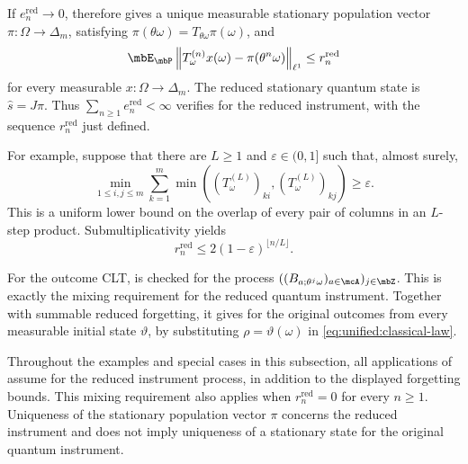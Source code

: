 \documentclass[a4paper]{article}
\numberwithin{equation}{section}   %
\theoremstyle{plain}   %
\theoremstyle{plain}   %
\theoremstyle{examplestyle}
\DeclareMathOperator{\pr}{\mbP}           %
\begin{document}
        If $e_n^{\mathrm{red}}\to0$,  therefore gives a unique measurable stationary population vector $\pi:\Omega\to\Delta_m$, satisfying $\pi(\theta\omega)=T_{\theta\omega}\pi(\omega)$, and
        \begin{equation}
        \label{eq:examples:population-forgetting}
             \mbE_{\pr}
             \left\|T_\omega^{(n)}x(\omega)-\pi(\theta^n\omega)\right\|_{\ell^1}
             \le r_n^{\mathrm{red}}
        \end{equation}
        for every measurable $x:\Omega\to\Delta_m$.
        The reduced stationary quantum state is $\widehat s=J\pi$.
        Thus $\sum_{n\ge1}e_n^{\mathrm{red}}<\infty$ verifies  for the reduced instrument, with the sequence $r_n^{\mathrm{red}}$ just defined.
        
        For example, suppose that there are $L\ge1$ and $\varepsilon\in(0,1]$ such that, almost surely,
        \[
         \min_{1\le i,j\le m}\sum_{k=1}^m
               \min\left((T_\omega^{(L)})_{ki},(T_\omega^{(L)})_{kj}\right)
         \ge\varepsilon.
        \]
        This is a uniform lower bound on the overlap of every pair of columns in an $L$-step product. 
        Submultiplicativity yields
        \begin{equation}
        \label{eq:unified:classical-rate}
             r_n^{\mathrm{red}}
             \le2(1-\varepsilon)^{\lfloor n/L\rfloor}.
        \end{equation}

    For the outcome CLT,  is checked for the process $((B_{a;\theta^j\omega})_{a\in\mcA})_{j\in\mbZ}$.
    This is exactly the mixing requirement for the reduced quantum instrument.
    Together with summable reduced forgetting, it gives  for the original outcomes from every measurable initial state $\vartheta$, by substituting $\rho=\vartheta(\omega)$ in \eqref{eq:unified:classical-law}. 

   Throughout the examples and special cases in this subsection, all applications of  assume  for the reduced instrument process, in addition to the displayed forgetting bounds.
    This mixing requirement also applies when $r_n^{\mathrm{red}}=0$ for every $n\ge1$.
    Uniqueness of the stationary population vector $\pi$ concerns the reduced instrument and does not imply uniqueness of a stationary state for the original quantum instrument.
\end{document}
